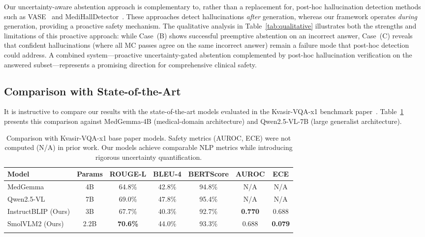 \documentclass[pdflatex,sn-mathphys-num]{sn-jnl}
\begin{document}
Our uncertainty-aware abstention approach is complementary to, rather than a replacement for, post-hoc hallucination detection methods such as VASE~\cite{yu2025vase} and MediHallDetector~\cite{chen2025medihalldetector}. These approaches detect hallucinations \textit{after} generation, whereas our framework operates \textit{during} generation, providing a proactive safety mechanism. The qualitative analysis in Table~\ref{tab:qualitative} illustrates both the strengths and limitations of this proactive approach: while Case~(B) shows successful preemptive abstention on an incorrect answer, Case~(C) reveals that confident hallucinations (where all MC passes agree on the same incorrect answer) remain a failure mode that post-hoc detection could address. A combined system---proactive uncertainty-gated abstention complemented by post-hoc hallucination verification on the answered subset---represents a promising direction for comprehensive clinical safety.

\subsection{Comparison with State-of-the-Art}

It is instructive to compare our results with the state-of-the-art models evaluated in the Kvasir-VQA-x1 benchmark paper~\cite{gautam2025kvasirx1}. Table~\ref{tab:sota_comparison} presents this comparison against MedGemma-4B (medical-domain architecture) and Qwen2.5-VL-7B (large generalist architecture).

\begin{table}[t]
\caption{Comparison with Kvasir-VQA-x1 base paper models. Safety metrics (AUROC, ECE) were not computed (N/A) in prior work. Our models achieve comparable NLP metrics while introducing rigorous uncertainty quantification.}\label{tab:sota_comparison}
\begin{tabular*}{\textwidth}{@{\extracolsep\fill}lcccccc}
\toprule
\textbf{Model} & \textbf{Params} & \textbf{ROUGE-L} & \textbf{BLEU-4} & \textbf{BERTScore} & \textbf{AUROC} & \textbf{ECE} \\
\midrule
MedGemma~\cite{gautam2025kvasirx1} & 4B & 64.8\% & 42.8\% & 94.8\% & N/A & N/A \\
Qwen2.5-VL~\cite{gautam2025kvasirx1} & 7B & 69.0\% & 47.8\% & 95.4\% & N/A & N/A \\
\midrule
InstructBLIP (Ours) & 3B & 67.7\% & 40.3\% & 92.7\% & \textbf{0.770} & 0.688 \\
SmolVLM2 (Ours) & 2.2B & \textbf{70.6\%} & 44.0\% & 93.3\% & 0.688 & \textbf{0.079} \\
\botrule
\end{tabular*}
\end{table}
\end{document}
